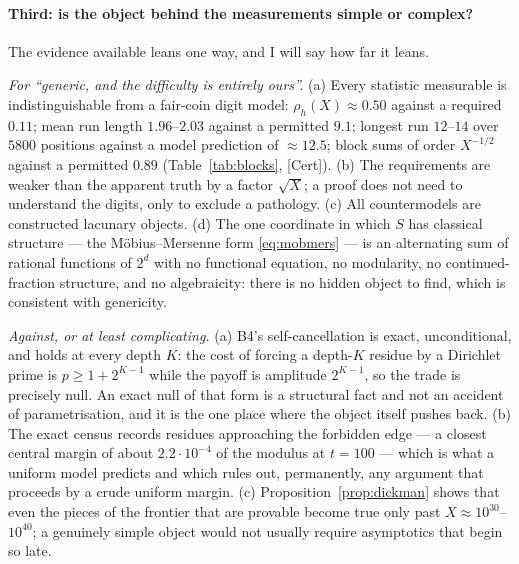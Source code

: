 \documentclass[11pt]{article}
\theoremstyle{breakplain}
\theoremstyle{breakdefinition}
\theoremstyle{breakdefinition}
\newcommand{\ev}[1]{{\small\textsf{[#1]}}\xspace}
\begin{document}
\paragraph{Third: is the object behind the measurements simple or complex?}
The evidence available leans one way, and I will say how far it leans.

\emph{For ``generic, and the difficulty is entirely ours''.} (a) Every
statistic measurable is indistinguishable from a fair-coin digit model:
$\rho_h(X)\approx0.50$ against a required $0.11$; mean run length
$1.96$--$2.03$ against a permitted $9.1$; longest run $12$--$14$ over $5800$
positions against a model prediction of $\approx12.5$; block sums of order
$X^{-1/2}$ against a permitted $0.89$ (Table~\ref{tab:blocks}, \ev{Cert}). (b) The
requirements are weaker than the apparent truth by a factor $\sqrt X$; a
proof does not need to understand the digits, only to exclude a pathology.
(c) All countermodels are constructed lacunary objects. (d) The one
coordinate in which $S$ has classical structure --- the M\"obius--Mersenne
form \eqref{eq:mobmers} --- is an alternating sum of rational functions of
$2^{d}$ with no functional equation, no modularity, no continued-fraction
structure, and no algebraicity: there is no hidden object to find, which is
consistent with genericity.

\emph{Against, or at least complicating.} (a) B4's self-cancellation is
exact, unconditional, and holds at every depth $K$: the cost of forcing a
depth-$K$ residue by a Dirichlet prime is $p\ge1+2^{K-1}$ while the payoff is
amplitude $2^{K-1}$, so the trade is precisely null. An exact null of that
form is a structural fact and not an accident of parametrisation, and it is
the one place where the object itself pushes back. (b) The exact census
records residues approaching the forbidden edge --- a closest central margin
of about $2.2\cdot10^{-4}$ of the modulus at $t=100$ --- which is what a
uniform model predicts and which rules out, permanently, any argument that
proceeds by a crude uniform margin. (c) Proposition~\ref{prop:dickman} shows
that even the pieces of the frontier that are provable become true only past
$X\approx10^{30}$--$10^{40}$; a genuinely simple object would not usually
require asymptotics that begin so late.
\end{document}
